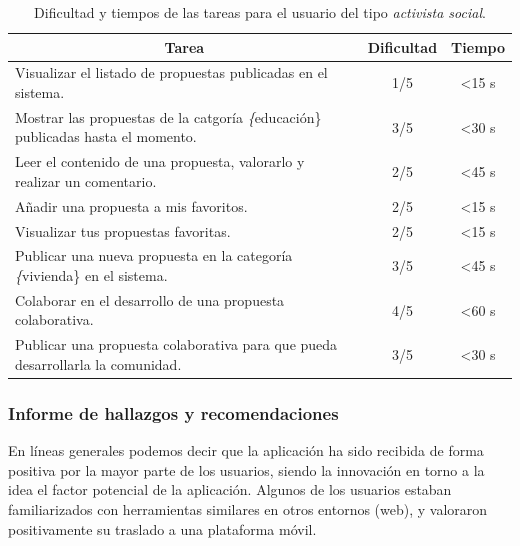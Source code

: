 \begin{table}[!]
\centering
\caption{Dificultad y tiempos de las tareas para el usuario del tipo \textit{activista social}.}
\label{tableUserEvS}
\begin{tabular}{|m{9cm}|c|c|}
\hline
\multicolumn{1}{|c|}{{\bf Tarea}}                                                       & {\bf Dificultad} & {\bf Tiempo}   \\ \hline
Visualizar el listado de propuestas publicadas en el sistema.                           & 1/5              & \textless 15 s \\ \hline
Mostrar las propuestas de la catgoría \textit\{educación\} publicadas hasta el momento. & 3/5              & \textless 30 s \\ \hline
Leer el contenido de una propuesta, valorarlo y realizar un comentario.                 & 2/5              & \textless 45 s \\ \hline
Añadir una propuesta a mis favoritos.                                                   & 2/5              & \textless 15 s \\ \hline
Visualizar tus propuestas favoritas.                                                    & 2/5              & \textless 15 s \\ \hline
Publicar una nueva propuesta en la categoría \textit\{vivienda\} en el sistema.         & 3/5              & \textless 45 s \\ \hline
Colaborar en el desarrollo de una propuesta colaborativa.                               & 4/5              & \textless 60 s \\ \hline
Publicar una propuesta colaborativa para que pueda desarrollarla la comunidad.          & 3/5              & \textless 30 s \\ \hline
\end{tabular}
\end{table}

\subsubsection{Informe de hallazgos y recomendaciones}

En líneas generales podemos decir que la aplicación ha sido recibida de forma positiva por la mayor parte de los usuarios, siendo la innovación en torno a la idea el factor potencial de la aplicación. Algunos de los usuarios estaban familiarizados con herramientas similares en otros entornos (web), y valoraron positivamente su traslado a una plataforma móvil.

